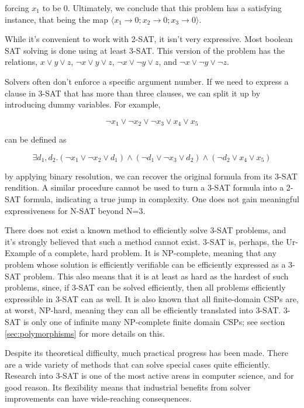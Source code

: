 forcing $x_1$ to be $0$. Ultimately, we conclude that this problem has a satisfying instance, that being the map $\langle x_1 \rightarrow 0; x_2 \rightarrow 0; x_3 \rightarrow 0\rangle$.

While it's convenient to work with 2-SAT, it isn't very expressive. Most boolean SAT solving is done using at least 3-SAT. This version of the problem has the relations, $x \vee y \vee z$, $\neg x \vee y \vee z$, $\neg x \vee \neg y \vee z$, and $\neg x \vee \neg y \vee \neg z$.

Solvers often don't enforce a specific argument number. If we need to express a clause in 3-SAT that has more than three clauses, we can split it up by introducing dummy variables. For example,

\begin{equation}\label{equation:three-sat-split-pt1}
\neg x_1 \vee \neg x_2 \vee \neg x_3 \vee x_4 \vee x_5
\end{equation}

can be defined as

\begin{equation}\label{equation:three-sat-split-pt1}
\exists d_1, d_2. (\neg x_1 \vee \neg x_2 \vee d_1) \wedge (\neg d_1 \vee \neg x_3 \vee d_2) \wedge (\neg d_2 \vee x_4 \vee x_5)
\end{equation}

by applying binary resolution, we can recover the original formula from its 3-SAT rendition. A similar procedure cannot be used to turn a 3-SAT formula into a 2-SAT formula, indicating a true jump in complexity. One does not gain meaningful expressiveness for N-SAT beyond N=3.

There does not exist a known method to efficiently solve 3-SAT problems, and it's strongly believed that such a method cannot exist. 3-SAT is, perhaps, the Ur-Example of a complete, hard problem. It is NP-complete, meaning that any problem whose solution is efficiently verifiable can be efficiently expressed as a 3-SAT problem. This also means that it is at least as hard as the hardest of such problems, since, if 3-SAT can be solved efficiently, then all problems efficiently expressible in 3-SAT can as well. It is also known that all finite-domain CSPs are, at worst, NP-hard, meaning they can all be efficiently translated into 3-SAT. 3-SAT is only one of infinite many NP-complete finite domain CSPs; see section \ref{sec:polymorphisms} for more details on this.

Despite its theoretical difficulty, much practical progress has been made. There are a wide variety of methods that can solve special cases quite efficiently. Research into 3-SAT is one of the most active areas in computer science, and for good reason. Its flexibility means that industrial benefits from solver improvements can have wide-reaching consequences.

